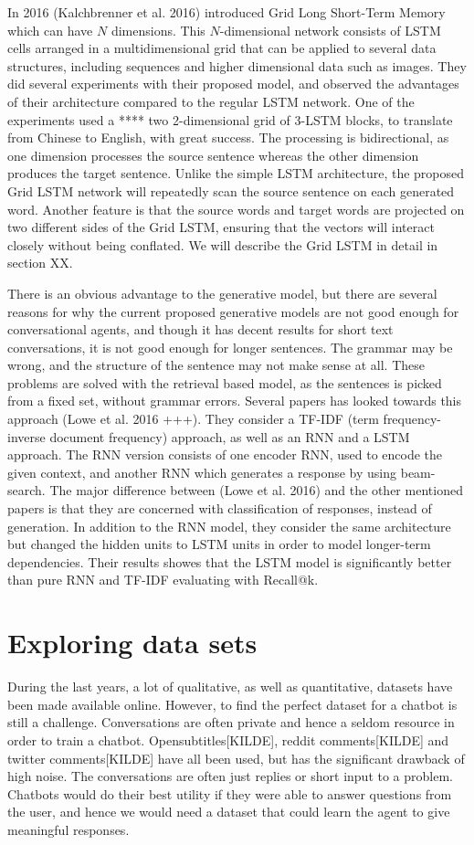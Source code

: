 \documentclass{article} %
\begin{document}
In 2016 (Kalchbrenner et al. 2016) introduced Grid Long Short-Term Memory which can have $N$ dimensions. This $N$-dimensional network consists of LSTM cells arranged in a multidimensional grid that can be applied to several data structures, including sequences and higher dimensional data such as images. They did several experiments with their proposed model, and observed the advantages of their architecture compared to the regular LSTM network. One of the experiments used a **** two 2-dimensional grid of 3-LSTM blocks, to translate from Chinese to English, with great success. The processing is bidirectional, as one dimension processes the source sentence whereas the other dimension produces the target sentence. Unlike the simple LSTM architecture, the proposed Grid LSTM network will repeatedly scan the source sentence on each generated word. Another feature is that the source words and target words are projected on two different sides of the Grid LSTM, ensuring that the vectors will interact closely without being conflated. We will describe the Grid LSTM in detail in section XX. 

There is an obvious advantage to the generative model, but there are several reasons for why the current proposed generative models are not good enough for conversational agents, and though it has decent results for short text conversations, it is not good enough for longer sentences. The grammar may be wrong, and the structure of the sentence may not make sense at all. These problems are solved with the retrieval based model, as the sentences is picked from a fixed set, without grammar errors. Several papers has looked towards this approach (Lowe et al. 2016 +++). They consider a TF-IDF (term frequency-inverse document frequency) approach, as well as an RNN and a LSTM approach. The RNN version consists of one encoder RNN, used to encode the given context, and another RNN which generates a response by using beam-search. The major difference between (Lowe et al. 2016) and the other mentioned papers is that they are concerned with classification of responses, instead of generation. In addition to the RNN model, they consider the same architecture but changed the hidden units to LSTM units in order to model longer-term dependencies. Their results showes that the LSTM model is significantly better than pure RNN and TF-IDF evaluating with Recall@k.

\section{Exploring data sets}
During the last years, a lot of qualitative, as well as quantitative, datasets have been made available online. However, to find the perfect dataset for a chatbot is still a challenge. Conversations are often private and hence a seldom resource in order to train a chatbot. Opensubtitles[KILDE], reddit comments[KILDE] and twitter comments[KILDE] have all been used, but has the significant drawback of high noise. The conversations are often just replies or short input to a problem. Chatbots would do their best utility if they were able to answer questions from the user, and hence we would need a dataset that could learn the agent to give meaningful responses.
\end{document}

